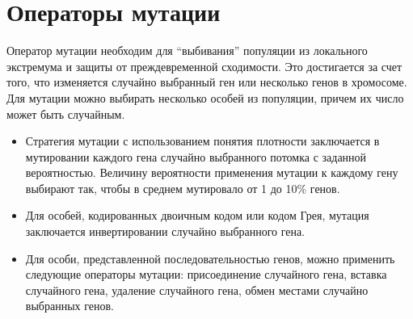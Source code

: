 \section{Операторы мутации}
Оператор мутации необходим для ``выбивания'' популяции из локального экстремума и защиты от преждевременной сходимости. Это достигается за счет того, что изменяется случайно выбранный ген или несколько генов в хромосоме. Для мутации можно выбирать несколько особей из популяции, причем их число может быть случайным.
\begin{itemize}[label=$\ast$]
	\item {}

Стратегия мутации с использованием понятия плотности заключается в мутировании каждого гена случайно выбранного потомка с заданной вероятностью. Величину вероятности применения мутации к каждому гену выбирают так, чтобы в среднем мутировало от 1 до 10\% генов.
	\item {}

Для особей, кодированных двоичным кодом или кодом Грея, мутация заключается инвертировании случайно выбранного гена.
	\item {}

Для особи, представленной последовательностью генов, можно применить следующие операторы мутации: присоединение случайного гена, вставка случайного гена, удаление случайного гена, обмен местами случайно выбранных генов.
\end{itemize}

